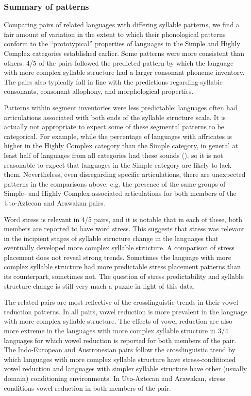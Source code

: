 \subsubsection{{Summary} {of} {patterns}}\label{sec:8.4.3.7}

  Comparing pairs of related languages with differing syllable patterns, we find a fair amount of variation in the extent to which their phonological patterns conform to the ``prototypical'' properties of languages in the Simple and Highly Complex categories established earlier. Some patterns were more consistent than others: 4/5 of the pairs followed the predicted pattern by which the language with more complex syllable structure had a larger consonant phoneme inventory. The pairs also typically fall in line with the predictions regarding syllabic consonants, consonant allophony, and morphological properties.

  Patterns within segment inventories were less predictable: languages often had articulations associated with both ends of the syllable structure scale. It is actually not appropriate to expect some of these segmental patterns to be categorical. For example, while the percentage of languages with affricates is higher in the Highly Complex category than the Simple category, in general at least half of languages from all categories had these sounds (), so it is not reasonable to expect that languages in the Simple category are likely to lack them. Nevertheless, even disregarding specific articulations, there are unexpected patterns in the comparisons above: e.g. the presence of the same groups of Simple- and Highly Complex-associated articulations for both members of the Uto-Aztecan and Arawakan pairs.

  Word stress is relevant in 4/5 pairs, and it is notable that in each of these, both members are reported to have word stress. This suggests that stress was relevant in the incipient stages of syllable structure change in the languages that eventually developed more complex syllable structure. A comparison of stress placement does not reveal strong trends. Sometimes the language with more complex syllable structure had more predictable stress placement patterns than its counterpart, sometimes not. The question of stress predictability and syllable structure change is still very much a puzzle in light of this data.

  The related pairs are most reflective of the crosslinguistic trends in their vowel reduction patterns. In all pairs, vowel reduction is more prevalent in the language with more complex syllable structure. The effects of vowel reduction are also more extreme in the languages with more complex syllable structure in 3/4 languages for which vowel reduction is reported for both members of the pair. The Indo-European and Austronesian pairs follow the crosslinguistic trend by which languages with more complex syllable structure have stress-conditioned vowel reduction and languages with simpler syllable structure have other (usually domain) conditioning environments. In Uto-Aztecan and Arawakan, stress conditions vowel reduction in both members of the pair.

